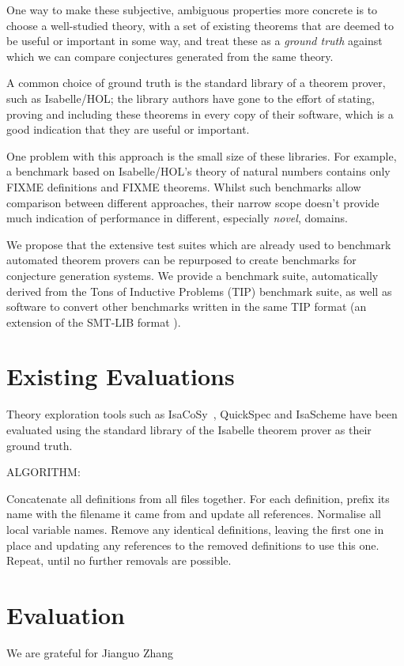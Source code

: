 One way to make these subjective, ambiguous properties more concrete is to
choose a well-studied theory, with a set of existing theorems that are deemed to
be useful or important in some way, and treat these as a \emph{ground truth}
against which we can compare conjectures generated from the same theory.

A common choice of ground truth is the standard library of a theorem prover,
such as Isabelle/HOL; the library authors have gone to the effort of stating,
proving and including these theorems in every copy of their software, which is a
good indication that they are useful or important.

One problem with this approach is the small size of these libraries. For
example, a benchmark based on Isabelle/HOL's theory of natural numbers contains
only FIXME definitions and FIXME theorems. Whilst such benchmarks allow
comparison between different approaches, their narrow scope doesn't provide much
indication of performance in different, especially \emph{novel}, domains.

We propose that the extensive test suites which are already used to benchmark
automated theorem provers can be repurposed to create benchmarks for conjecture
generation systems. We provide a benchmark suite, automatically derived from the
Tons of Inductive Problems (TIP) benchmark suite, as well as software to convert
other benchmarks written in the same TIP format (an extension of the SMT-LIB
format \cite{BarFT-SMTLIB}).

\section{Existing Evaluations}
\label{sec:previous}

Theory exploration tools such as
IsaCoSy~\cite{Johansson.Dixon.Bundy:conjecture-generation}, QuickSpec and
IsaScheme have been evaluated using the standard library of the Isabelle theorem
prover as their ground truth.

ALGORITHM:

Concatenate all definitions from all files together.
For each definition, prefix its name with the filename it came from and update all references.
Normalise all local variable names.
Remove any identical definitions, leaving the first one in place and updating any references to the removed definitions to use this one.
Repeat, until no further removals are possible.

\section{Evaluation}
\label{sec:evaluation}


\begin{acknowledgements}
We are grateful for Jianguo Zhang
\end{acknowledgements}





